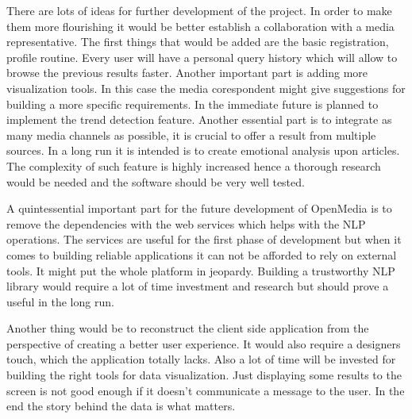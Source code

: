 There are lots of ideas for further development of the project. In order to make them more flourishing it would be better establish a collaboration with a media representative. The first things that would be added are the basic registration, profile routine. Every user will have a personal query history which will allow to browse the previous results faster. Another important part is adding more visualization tools. In this case the media corespondent might give suggestions for building a more specific requirements. In the immediate future is planned to implement the trend detection feature. Another essential part is to integrate as many media channels as possible, it is crucial to offer a result from multiple sources. In a long run it is intended is to create emotional analysis upon articles. The complexity of such feature is highly increased hence a thorough research would be needed and the software should be very well tested.

A quintessential important part for the future development of OpenMedia is to remove the dependencies with the web services which helps with the NLP operations. The services are useful for the first phase of development but when it comes to building reliable applications it can not be afforded to rely on external tools. It might put the whole platform in jeopardy. Building a trustworthy NLP library would require a lot of time investment and research but should prove a useful in the long run.

Another thing would be to reconstruct the client side application from the perspective of creating a better user experience. It would also require a designers touch, which the application totally lacks. Also a lot of time will be invested for building the right tools for data visualization. Just displaying some results to the screen is not good enough if it doesn't communicate a message to the user. In the end the story behind the data is what matters.
\clearpage
